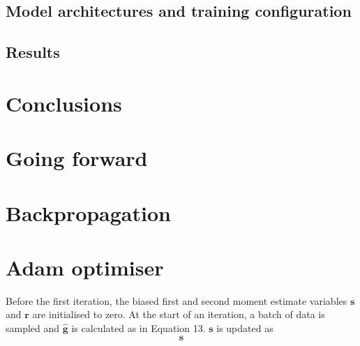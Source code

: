 \documentclass[12pt]{article}
\begin{document}
\subsection{Model architectures and training configuration}

\subsection{Results}

\section{Conclusions}

\section{Going forward}




\appendix
\appendixpage
\section{Backpropagation}
\section{Adam optimiser}
Before the first iteration, the biased first and second moment estimate variables $\bm{s}$ and $\bm{r}$ are initialised to zero. At the start of an iteration, a batch of data is sampled and $\hat{\bm{g}}$ is calculated as in Equation 13. $\bm{s}$ is updated as
\begin{equation}
\bm{s}
\end{equation}        
\end{document}
